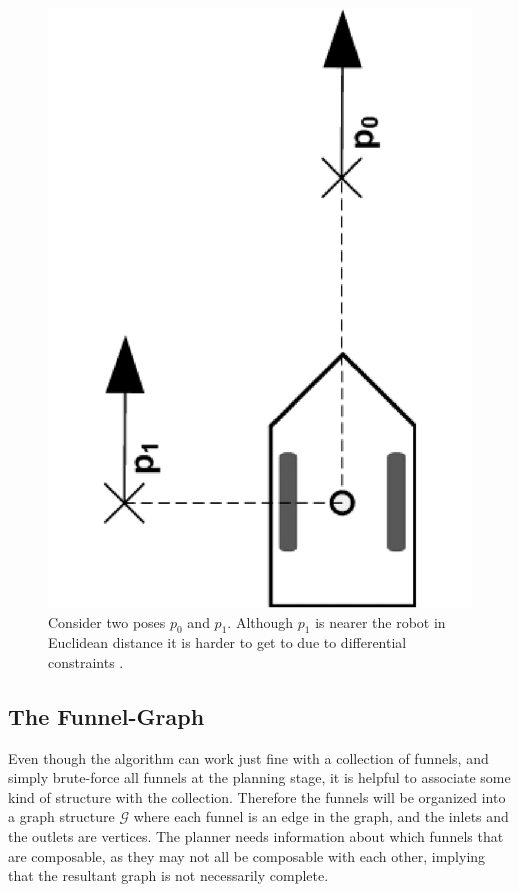 \begin{figure}[!t]
  \centering
  \includegraphics[scale=.2,angle=-90]{figures/rrtfunnel/non-holonomic-vehicle-euclidean-weakness}
  \caption[Distance metrics for non-holonomic vehicles]{Consider two poses
    \(p_0\) and \(p_1\). Although \(p_1\) is nearer the robot in Euclidean
    distance it is harder to get to due to differential constraints
    \textcite{parkFeedbackMotionPlanning2015}.}
  \label{fig:non-holonomic-vehicle-euclidean-weakness}
\end{figure}


\subsection{The Funnel-Graph}

Even though the \rrtfunnel{} algorithm can work just fine with a collection of
funnels, and simply brute-force all funnels at the planning stage, it is helpful
to associate some kind of structure with the collection. Therefore the funnels
will be organized into a graph structure \(\mathcal{G}\) where each funnel is an
edge in the graph, and the inlets and the outlets are vertices. The planner
needs information about which funnels that are composable, as they may not all
be composable with each other, implying that the resultant graph is not
necessarily complete.

